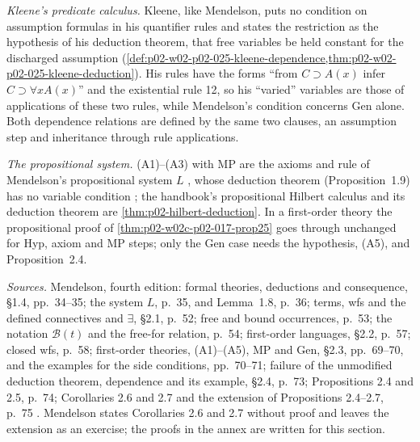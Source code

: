 \emph{Kleene's predicate calculus.}  Kleene, like Mendelson, puts no
condition on assumption formulas in his quantifier rules and states the
restriction as the hypothesis of his deduction theorem, that free variables
be held constant for the discharged assumption
(\cref{def:p02-w02-p02-025-kleene-dependence,thm:p02-w02-p02-025-kleene-deduction}).
His rules have the forms ``from \(C\supset A(x)\) infer
\(C\supset\forall xA(x)\)'' and the existential rule 12, so his ``varied''
variables are those of applications of these two rules, while Mendelson's
condition concerns Gen alone.  Both dependence relations are defined by the
same two clauses, an assumption step and inheritance through rule
applications.

\emph{The propositional system.}  (A1)--(A3) with MP are the axioms and rule
of Mendelson's propositional system \(L\)
\cite[\S 1.4, p.~35]{Mendelson1997}, whose deduction theorem
(Proposition~1.9) has no variable condition
\cite[\S 1.4, p.~37]{Mendelson1997}; the handbook's propositional Hilbert
calculus and its deduction theorem are \cref{thm:p02-hilbert-deduction}.  In
a first-order theory the propositional proof of
\cref{thm:p02-w02c-p02-017-prop25} goes through unchanged for Hyp, axiom and
MP steps; only the Gen case needs the hypothesis, (A5), and
Proposition~2.4.

\emph{Sources.}  Mendelson, fourth edition: formal theories, deductions and
consequence, \S 1.4, pp.~34--35; the system \(L\), p.~35, and Lemma~1.8,
p.~36; terms, wfs and the defined connectives and \(\exists\), \S 2.1,
p.~52; free and bound occurrences, p.~53; the notation \(\mathscr B(t)\) and
the free-for relation, p.~54; first-order languages, \S 2.2, p.~57; closed
wfs, p.~58; first-order theories, (A1)--(A5), MP and Gen, \S 2.3, pp.~69--70,
and the examples for the side conditions, pp.~70--71; failure of the
unmodified deduction theorem, dependence and its example, \S 2.4, p.~73;
Propositions 2.4 and 2.5, p.~74; Corollaries 2.6 and 2.7 and the extension
of Propositions 2.4--2.7, p.~75 \cite{Mendelson1997}.  Mendelson states
Corollaries 2.6 and 2.7 without proof and leaves the extension as an
exercise; the proofs in the annex are written for this section.
